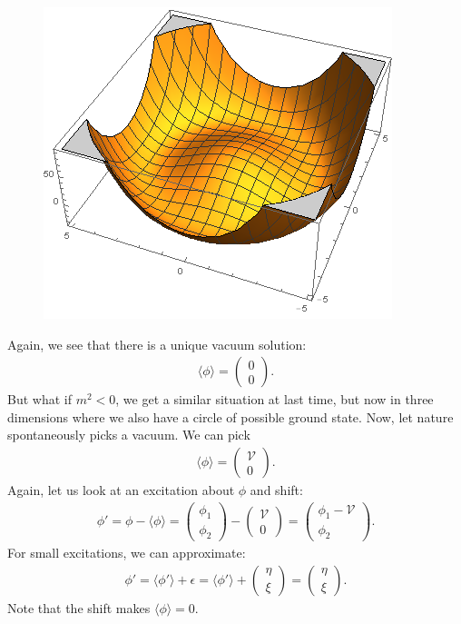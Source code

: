 \documentclass[a4paper,11pt]{article}
\numberwithin{equation}{section}
\theoremstyle{definition}
\begin{document}
\begin{figure}[h!]
	\centering
	\includegraphics[scale=1]{hat.png}
\end{figure}
Again, we see that there is a unique vacuum solution:
\begin{align}
\langle \phi \rangle = \begin{pmatrix}
0\\0
\end{pmatrix}.
\end{align}
But what if $m^2 < 0$, we get a similar situation at last time, but now in three dimensions where we also have a circle of possible ground state. Now, let nature spontaneously picks a vacuum. We can pick
\begin{align}
\langle \phi \rangle = \begin{pmatrix}
\mathcal{V}\\0
\end{pmatrix}.
\end{align}
Again, let us look at an excitation about $\phi$ and shift:
\begin{align}
\phi' = \phi - \langle \phi \rangle = \begin{pmatrix}
\phi_1\\\phi_2
\end{pmatrix} - \begin{pmatrix}
\mathcal{V}\\0
\end{pmatrix} = 
\begin{pmatrix}
\phi_1 - \mathcal{V}\\\phi_2
\end{pmatrix}.
\end{align}
For small excitations, we can approximate:
\begin{align}
\phi' = \langle \phi'\rangle + \epsilon = \langle \phi' \rangle + \begin{pmatrix}
\eta \\ \xi
\end{pmatrix}=
\begin{pmatrix}
\eta \\ \xi
\end{pmatrix}.
\end{align}
Note that the shift makes $\langle \phi \rangle = 0$.\\
\end{document}
